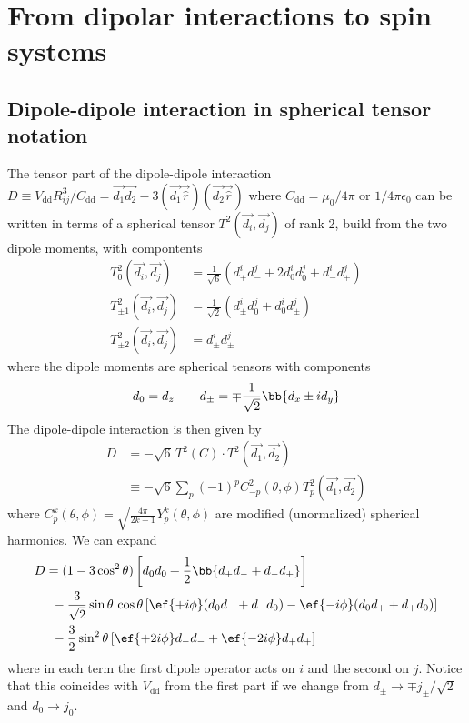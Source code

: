 \chapter{From dipolar interactions to spin systems}
\section{Dipole-dipole interaction in spherical tensor notation}
The tensor part of the dipole-dipole interaction $D\equiv V_\text{dd} R_{ij}^3/C_\text{dd}=\vec{d_1}\vec{d_2}-3(\vec{d_1}\vec{\hat{r}})(\vec{d_2}\vec{\hat{r}})$ where $C_\text{dd} = \mu_0 /4\pi$ or $1/4\pi\epsilon_0$ can be written in terms of a spherical tensor $T^2(\vec{d_i},\vec{d_j})$ of rank 2, build from the two dipole moments, with compontents~\cite{Moller2009}
\begin{align*}
T^2_0(\vec{d_i},\vec{d_j}) &= \frac{1}{\sqrt{6}} (d^i_+ d^j_- + 2d^i_0 d^j_0 + d^i_{-} d^j_{+})\\
T^2_{\pm 1}(\vec{d_i},\vec{d_j}) &= \frac{1}{\sqrt{2}} (d^i_{\pm} d^j_0 + d^i_0 d^j_{\pm})\\
T^2_{\pm 2}(\vec{d_i},\vec{d_j}) &= d^i_{\pm} d^j_{\pm}
\end{align*}
where the dipole moments are spherical tensors with components
\begin{align}\label{eq:dipsph}
d_0 = d_z\qquad d_\pm = \mp\frac{1}{\sqrt{2}}\bb{d_x\pm i d_y}
\end{align}
The dipole-dipole interaction is then given by
\begin{align}
D &= -\sqrt{6} \,T^2(C)\cdot T^2(\vec{d_1},\vec{d_2})\\
&\equiv-\sqrt{6}  \sum_p (-1)^p C^2_{-p}(\theta,\phi) T^2_p(\vec{d_1},\vec{d_2})\nonumber
\end{align}
where $C^k_p(\theta,\phi)=\sqrt{\frac{4\pi}{2k+1}} Y^k_p(\theta,\phi)$ are modified (unormalized) spherical harmonics. We can expand
\begin{align*}
D &= (1-3\cos^2 \theta) \left[d_0 d_0 + \frac{1}{2}\bb{d_+ d_- + d_- d_+} \right] \\
&\,\,\,-\frac{3}{\sqrt{2}}\sin\theta \,\cos\theta \left[ \ef{+i\phi} (d_0 d_- + d_- d_0) - \ef{-i\phi} (d_0 d_+ + d_+ d_0) \right]\\
&\,\,\,-\frac{3}{2}\sin^2\theta \left[ \ef{+2i\phi} d_- d_- + \ef{-2i\phi} d_+ d_+\right]
\end{align*}
where in each term the first dipole operator acts on $i$ and the second on $j$. Notice that this coincides with $V_\text{dd}$ from the first part if we change from $d_\pm \rightarrow \mp j_\pm/\sqrt{2}$ and $d_0\rightarrow j_0$.

